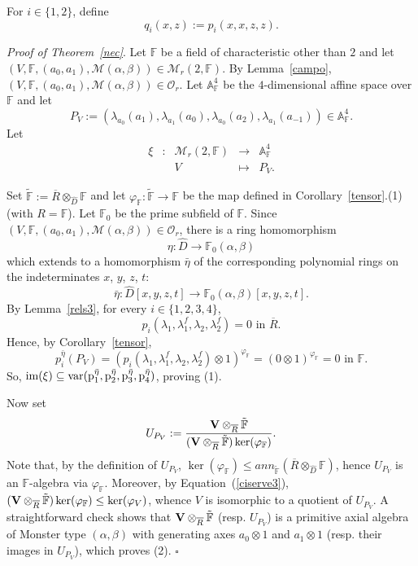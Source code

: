 \documentclass[a4paper]{amsart}
\newcommand{\Ro}{{\overline R}}
\newcommand{\Vo}{{\bf V}}
\newcommand{\Var}{{\rm var}}
\newcommand{\F}{{\mathbb F}}
\newcommand{\im}{\rm im}
\newcommand{\lm}{\lambda}
\newcommand{\lmf}{\lambda_1^f}
\newcommand{\lmd}{\lambda_2}
\newcommand{\lmdf}{\lambda_2^f}
\newcommand{\al}{\alpha}
\newcommand{\bt}{\beta}
\begin{document}
For $i\in \{1,2\}$, define
$$q_i(x,z):=p_i(x,x,z,z).
$$ 
\bigskip

{\it Proof of Theorem~\ref{nec}}.
Let $\F$ be a field of characteristic other than $2$ and let $(V, \F, (a_0, a_1), \mathcal M(\al, \bt)) \in \mathcal M_r(2,\F)$. By Lemma~\ref{campo},  $(V, \F, (a_0, a_1), \mathcal M(\al, \bt)) \in \mathcal O_r$.
Let $\mathbb A^4_\F$ be the $4$-dimensional affine space over $\F$ and let 
$$
 P_V:=(\lambda_{ a_0}( a_1), \lambda_{ a_1}( a_0), \lambda_{ a_0}( a_2), \lambda_{ a_1}( a_{-1}))\in \mathbb A^4_\F.
 $$
Let 
\begin{equation*}
\begin{array}{ccccc}
 \xi &\colon &\mathcal M_r(2,\F) &\to &\mathbb A^4_\F \\
  & & V & \mapsto & P_V.
  \end{array}
  \end{equation*}
 
Set $\tilde \F:=\Ro\otimes_{\hat D} \F$ and  let $\varphi_\F\colon \tilde \F\to \F$ be the map defined in Corollary~\ref{tensor}.(1) (with $R=\F$). Let $\F_0$ be the prime subfield of $\F$. Since $(V, \F, (a_0, a_1), \mathcal M(\al, \bt)) \in \mathcal O_r$, there is a ring homomorphism 
 $$
 \eta: \hat D \to \F_0(\al, \bt)
 $$
which extends  to a homomorphism $\bar \eta$ of the corresponding polynomial rings on the indeterminates $x$, $y$, $z$, $t$:
$$
\bar \eta: \hat D[x,y,z,t]\to  \F_0(\al, \bt)[x,y,z,t].
$$   
By Lemma~\ref{rels3}, for every $i\in \{1,2,3,4\}$, 
$$
p_i(\lm_1, \lmf, \lmd, \lmdf)=0 \mbox{ in } \Ro.
$$
Hence, by Corollary~\ref{tensor}, 
$$
p_i^{\bar \eta}(P_V)=(p_i(\lm_1, \lmf, \lmd, \lmdf)\otimes 1)^{\varphi_\F}=(0 \otimes 1)^{\varphi_\F}=0  \mbox{ in } \F.
$$
So, $\im (\xi) \subseteq \Var(p_1^{\bar \eta}, p_2^{\bar \eta}, p_3^{\bar \eta}, p_4^{\bar \eta})$, 
proving (1).

Now set
$$
U_{P_V}:=\frac{\Vo\otimes_{\Ro} \tilde \F}{(\Vo\otimes_{\Ro} \tilde \F)\ker (\varphi_\F)}.
$$
Note that, by the definition of $U_{P_V}$, $\ker (\varphi_\F)\leq ann_{\tilde \F}(\Ro\otimes_{\hat D} \F)$, hence $U_{P_V}$ is an $\F$-algebra via $\varphi_\F$. Moreover, by Equation~(\ref{ciserve3}), $(\Vo\otimes_{\Ro} \tilde \F)\ker (\varphi_\F)\leq \ker (\varphi_V)$, whence $V$ is isomorphic to a quotient of $U_{P_V}$. 
A straightforward check shows that $\Vo\otimes_{\Ro} \tilde \F$ (resp. $U_{P_V}$) is a primitive axial algebra of Monster type $(\alpha, \beta)$ with generating axes $a_0\otimes 1$ and $a_1\otimes 1$ (resp. their images in $U_{P_V}$), which proves (2).
\hfill $\square$
\bigskip
\end{document}
